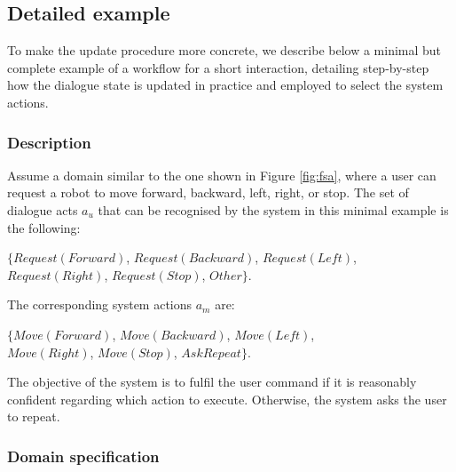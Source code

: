 \subsection{Detailed example}
\label{sec:detailedexample}

To make the update procedure more concrete, we describe below a minimal but complete example of a workflow for a short interaction, detailing step-by-step how the dialogue state is updated in practice and employed to select the system actions. 

\subsubsection*{Description}

Assume a domain similar to the one shown in Figure \ref{fig:fsa}, where a user can request a robot to move forward, backward, left, right, or stop.  The set of dialogue acts $a_u$ that can be recognised by the system in this minimal example is the following: 
\begin{center}
$\{\mathit{Request(Forward)}$, $\mathit{Request(Backward)}$, $\mathit{Request(Left)}$, \\ $\mathit{Request(Right)}$, $\mathit{Request(Stop)}$, $\mathit{Other}\}$. \\
\end{center}
The corresponding system actions $a_m$ are: 
\begin{center}
$\{\mathit{Move(Forward)}$, $\mathit{Move(Backward)}$, $\mathit{Move(Left)}$, \\ $\mathit{Move(Right)}$, $\mathit{Move(Stop)}$, $\mathit{AskRepeat}\}$. 
\end{center}
The objective of the system is to fulfil the user command if it is reasonably confident regarding which action to execute.  Otherwise, the system asks the user to repeat. 

\subsubsection*{Domain specification}


